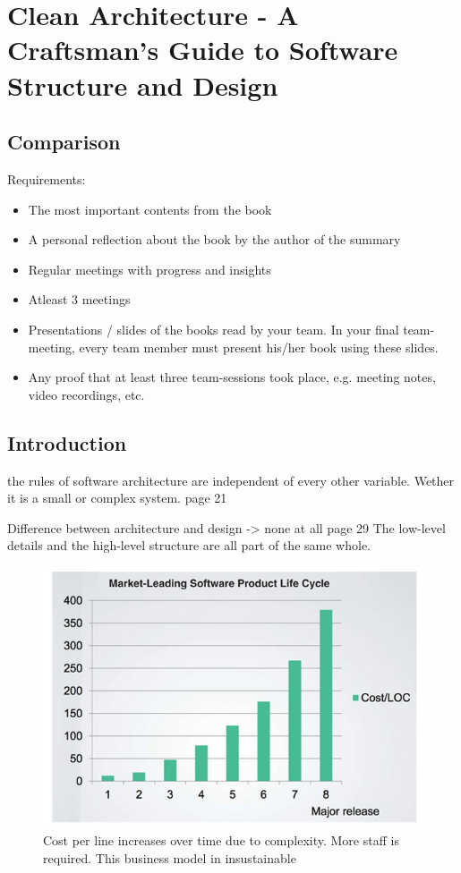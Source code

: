 \documentclass[../Main.tex]{subfiles}
\begin{document}
\chapter{Clean Architecture - A Craftsman's Guide  to Software Structure and Design}


\section{Comparison}


Requirements:
\begin{itemize}
    \item The most important contents from the book
    \item A personal reflection about the book by the author of the summary
    \item Regular meetings with progress and insights
    \item Atleast 3 meetings
    \item Presentations / slides of the books read by your team. In your final team-meeting, every team
          member must present his/her book using these slides.
    \item Any proof that at least three team-sessions took place, e.g. meeting notes, video recordings, etc.
\end{itemize}

\section{Introduction}

the	rules	of	software	architecture	are
independent	of	every	other	variable.
Wether it is a small or complex system. page 21

Difference between architecture and design -> none at all page 29
The	low-level	details	and	the	high-level
structure	are	all	part	of	the	same	whole.


\begin{figure}[H]
    \centering
    \includegraphics[width=0.75\linewidth]{Images/cpl-over-time.png}
    \caption{Cost per line increases over time due to complexity. More staff is required. This business model in insustainable}
\end{figure}
\end{document}
